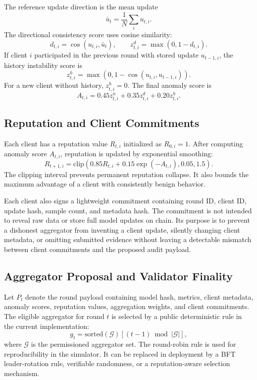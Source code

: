 \documentclass[preprint,authoryear,12pt]{elsarticle}
\begin{document}
The reference update direction is the mean update
\begin{equation}
\bar{u}_t=\frac{1}{N}\sum_i u_{t,i}.
\end{equation}
The directional consistency score uses cosine similarity:
\begin{equation}
d_{t,i}=\cos(u_{t,i},\bar{u}_t), \qquad
z^d_{t,i}=\max(0,1-d_{t,i}).
\end{equation}
If client $i$ participated in the previous round with stored update $u_{t-1,i}$, the history instability score is
\begin{equation}
z^h_{t,i}=\max(0,1-\cos(u_{t,i},u_{t-1,i})).
\end{equation}
For a new client without history, $z^h_{t,i}=0$. The final anomaly score is
\begin{equation}
A_{t,i}=0.45z^n_{t,i}+0.35z^d_{t,i}+0.20z^h_{t,i}.
\end{equation}

\subsection{Reputation and Client Commitments}

Each client has a reputation value $R_{t,i}$ initialized as $R_{0,i}=1$. After computing anomaly score $A_{t,i}$, reputation is updated by exponential smoothing:
\begin{equation}
R_{t+1,i}=\mathrm{clip}\left(0.85R_{t,i}+0.15\exp(-A_{t,i}),0.05,1.5\right).
\end{equation}
The clipping interval prevents permanent reputation collapse. It also bounds the maximum advantage of a client with consistently benign behavior.

Each client also signs a lightweight commitment containing round ID, client ID, update hash, sample count, and metadata hash. The commitment is not intended to reveal raw data or store full model updates on chain. Its purpose is to prevent a dishonest aggregator from inventing a client update, silently changing client metadata, or omitting submitted evidence without leaving a detectable mismatch between client commitments and the proposed audit payload.

\subsection{Aggregator Proposal and Validator Finality}

Let $P_t$ denote the round payload containing model hash, metrics, client metadata, anomaly scores, reputation values, aggregation weights, and client commitments. The eligible aggregator for round $t$ is selected by a public deterministic rule in the current implementation:
\begin{equation}
g_t=\mathrm{sorted}(\mathcal{G})[(t-1)\bmod |\mathcal{G}|],
\end{equation}
where $\mathcal{G}$ is the permissioned aggregator set. The round-robin rule is used for reproducibility in the simulator. It can be replaced in deployment by a BFT leader-rotation rule, verifiable randomness, or a reputation-aware selection mechanism.
\end{document}
